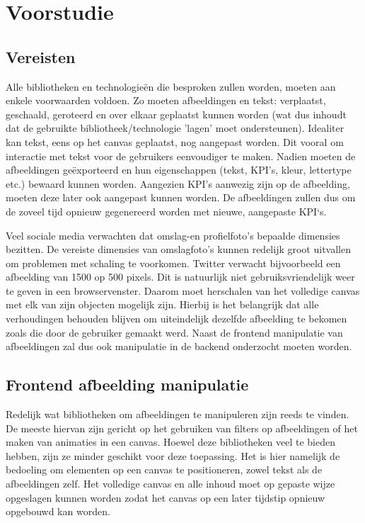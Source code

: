 
\chapter{Voorstudie}
\vspace{-3cm}
\section{\textbf{Vereisten}} \label{vereisten}
Alle bibliotheken en technologie\"{e}n die besproken zullen worden, moeten aan enkele voorwaarden voldoen. Zo moeten afbeeldingen en tekst: verplaatst, geschaald, geroteerd en over elkaar geplaatst kunnen worden (wat dus inhoudt dat de gebruikte bibliotheek/technologie 'lagen' moet ondersteunen). Idealiter kan tekst, eens op het canvas geplaatst, nog aangepast worden. Dit vooral om interactie met tekst voor de gebruikers eenvoudiger te maken. Nadien moeten de afbeeldingen ge\"{e}xporteerd en hun eigenschappen (tekst, KPI's, kleur, lettertype etc.) bewaard kunnen worden. Aangezien KPI's aanwezig zijn op de afbeelding, moeten deze later ook aangepast kunnen worden. De afbeeldingen zullen dus om de zoveel tijd opnieuw gegenereerd worden met nieuwe, aangepaste KPI`s. 

Veel sociale media verwachten dat omslag-en profielfoto's bepaalde dimensies bezitten. De vereiste dimensies van omslagfoto's kunnen redelijk groot uitvallen om problemen met schaling te voorkomen. Twitter verwacht bijvoorbeeld een afbeelding van 1500 op 500 pixels. Dit is natuurlijk niet gebruiksvriendelijk weer te geven in een browservenster. Daarom moet herschalen van het volledige canvas met elk van zijn objecten mogelijk zijn. Hierbij is het belangrijk dat alle verhoudingen behouden blijven om uiteindelijk dezelfde afbeelding te bekomen zoals die door de gebruiker gemaakt werd. Naast de frontend manipulatie van afbeeldingen zal dus ook manipulatie in de backend onderzocht moeten worden.  

\section{\textbf{Frontend afbeelding manipulatie}}
Redelijk wat bibliotheken om afbeeldingen te manipuleren zijn reeds te vinden. De meeste hiervan zijn gericht op het gebruiken van filters op afbeeldingen of het maken van animaties in een canvas. Hoewel deze bibliotheken veel te bieden hebben, zijn ze minder geschikt voor deze toepassing. Het is hier namelijk de bedoeling om elementen op een canvas te positioneren, zowel tekst als de afbeeldingen zelf. Het volledige canvas en alle inhoud moet op gepaste wijze opgeslagen kunnen worden zodat het canvas op een later tijdstip opnieuw opgebouwd kan worden. 


